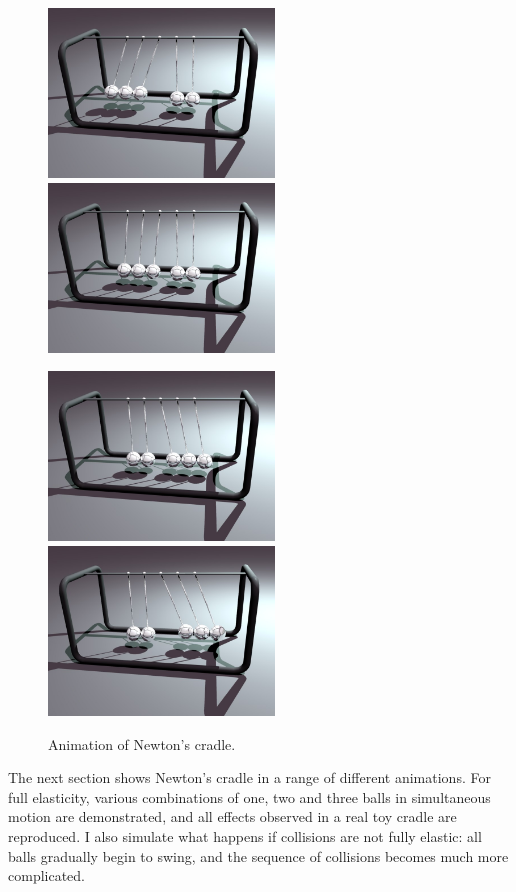\begin{figure}[p]
\centerline{\includegraphics[width=60mm,height=45mm]{figures/cradle1} \hspace{5mm}
            \includegraphics[width=60mm,height=45mm]{figures/cradle2}}\vspace{5mm}
\centerline{\includegraphics[width=60mm,height=45mm]{figures/cradle3} \hspace{5mm}
            \includegraphics[width=60mm,height=45mm]{figures/cradle4}}
\caption{Animation of Newton's cradle.\label{sampleCradle}}
\end{figure}

The next section shows Newton's cradle in a range of different animations. For full elasticity,
various combinations of one, two and three balls in simultaneous motion are demonstrated, and all
effects observed in a real toy cradle are reproduced. I also simulate what happens if collisions
are not fully elastic: all balls gradually begin to swing, and the sequence of collisions becomes
much more complicated.

